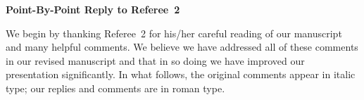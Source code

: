 \documentclass[11pt]{article}
\begin{document}


\clearpage
\begin{center}
  {\bf \Large Point-By-Point Reply to Referee~2}
\end{center}

We begin by thanking Referee~2 for his/her careful reading of our
manuscript and many helpful comments. We believe we have addressed all
of these comments in our revised manuscript and that in so doing we
have improved our presentation significantly.  In what follows, the
original comments appear in italic type; our replies and comments are
in roman type.

\bigskip

\end{document}
